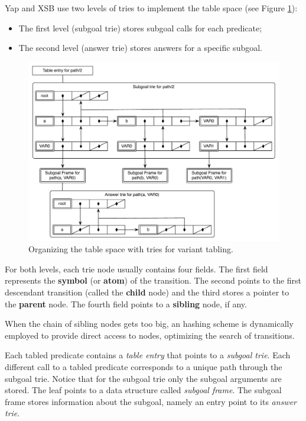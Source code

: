 Yap and XSB use two levels of tries to implement the table space (see Figure \ref{fig:table_space_tries}):

\begin{itemize}
  \item The first level (subgoal trie) stores subgoal calls for each predicate;
  \item The second level (answer trie) stores answers for a specific subgoal.
\end{itemize}

\begin{figure}[ht]
   \centering
     \includegraphics[scale=0.6]{two_level_tries.pdf}
   \caption{Organizing the table space with tries for variant tabling.}
   \label{fig:table_space_tries}
 \end{figure}

For both levels, each trie node usually contains four fields. The first field represents the \textbf{symbol} (or \textbf{atom})
of the transition. The second points to the first descendant transition (called the \textbf{child} node)
and the third stores a pointer to the \textbf{parent} node.
The fourth field points to a \textbf{sibling} node, if any.

When the chain of sibling nodes gets too big, an hashing scheme is dynamically employed to provide direct
access to nodes, optimizing the search of transitions.

Each tabled predicate contains a \textit{table entry} that points to a \textit{subgoal trie}.
Each different call to a tabled predicate corresponds to a unique path through the subgoal trie.
Notice that for the subgoal trie only the subgoal arguments are stored.
The leaf points to a data structure called \textit{subgoal frame}. The subgoal frame stores
information about the subgoal, namely an entry point to its \textit{answer trie}.

